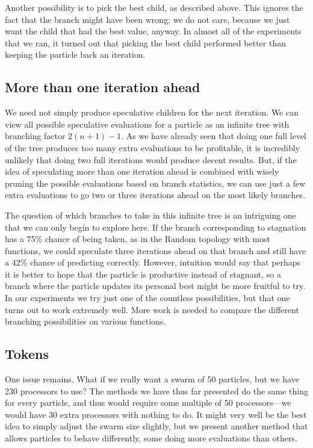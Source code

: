 \documentclass[journal,letterpaper]{IEEEtran}
\begin{document}
Another possibility is to pick the best child, as described above.  This
ignores the fact that the branch might have been wrong; we do not care, because
we just want the child that had the best value, anyway.  In almost all of the
experiments that we ran, it turned out that picking the best child performed
better than keeping the particle back an iteration.

\subsection{More than one iteration ahead}

We need not simply produce speculative children for the next iteration.  We can
view all possible speculative evaluations for a particle as an infinite tree
with branching factor $2(n+1)-1$.  As we have already seen that doing one full
level of the tree produces too many extra evaluations to be profitable, it is
incredibly unlikely that doing two full iterations would produce decent
results.  But, if the idea of speculating more than one iteration ahead is
combined with wisely pruning the possible evaluations based on branch
statistics, we can use just a few extra evaluations to go two or three
iterations ahead on the most likely branches.

The question of which branches to take in this infinite tree is an intriguing
one that we can only begin to explore here.  If the branch corresponding to
stagnation has a 75\% chance of being taken, as in the Random topology with
most functions, we could speculate three iterations ahead on that branch and
still have a 42\% chance of predicting correctly.  However, intuition would say
that perhaps it is better to hope that the particle is productive instead of
stagnant, so a branch where the particle updates its personal best might be
more fruitful to try.  In our experiments we try just one of the countless
possibilities, but that one turns out to work extremely well.  More work is
needed to compare the different branching possibilities on various functions.

\subsection{Tokens}

One issue remains.  What if we really want a swarm of 50 particles, but we have
230 processors to use?  The methods we have thus far presented do the same
thing for every particle, and thus would require some multiple of 50
processors---we would have 30 extra processors with nothing to do.  It might
very well be the best idea to simply adjust the swarm size slightly, but we
present another method that allows particles to behave differently, some doing
more evaluations than others.
\end{document}
